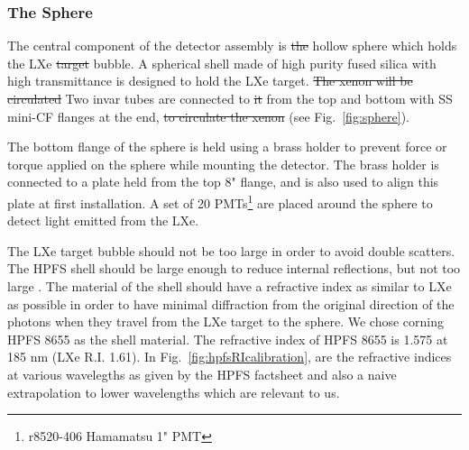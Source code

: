 \subsubsection{The Sphere}
\label{subsubsec:sphere}

The central component of the detector assembly is \sout{the} hollow sphere which holds the LXe \sout{target} bubble. A spherical shell made of high purity fused silica with high transmittance is designed to hold the LXe target. \sout{The xenon will be circulated} Two invar tubes are connected to \sout{it} from the top and bottom with 
SS mini-CF flanges at the end, \sout{to circulate the xenon} (see Fig.~\ref{fig:sphere}). 

The bottom flange of the sphere is held using a brass holder to prevent force or torque applied on the sphere while mounting the detector. The 
brass holder is connected to a plate held from the top 8" flange, and is also used to align this plate at first installation. A set of 20 PMTs\footnote{r8520-406 Hamamatsu 1" PMT} are placed around the sphere to detect light emitted from the LXe.


The LXe target bubble should not be too large in order to avoid double scatters. The HPFS shell should be large enough to reduce internal reflections, but not too large  . The material of the shell should have a refractive index as similar to LXe as possible in order to have minimal diffraction from the original direction of the photons when they travel from the LXe target to the sphere. We chose corning HPFS 8655 as the shell material. The refractive index of HPFS 8655 is 1.575 at 185 nm (LXe R.I. 1.61). In Fig.~\ref{fig:hpfsRIcalibration}, are the refractive  indices at various wavelegths as given by the HPFS factsheet and also a naive extrapolation to lower wavelengths which are relevant to us. %

